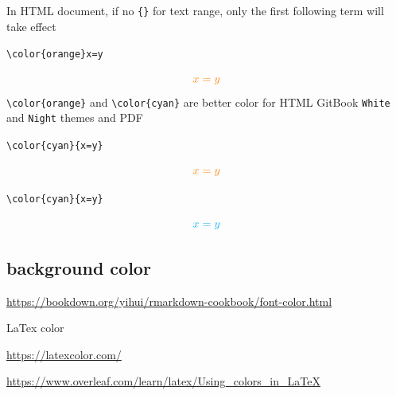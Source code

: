 \documentclass[
]{book}
\newenvironment{Shaded}{\begin{snugshade}}{\end{snugshade}}
\newcommand{\NormalTok}[1]{#1}
\theoremstyle{definition}
\theoremstyle{definition}
\theoremstyle{definition}
\theoremstyle{definition}
\theoremstyle{remark}
\begin{document}
In HTML document, if no \texttt{\{\}} for text range, only the first following term will take effect

\texttt{\textbackslash{}color\{orange\}x=y}

\[\color{orange}x=y\]
\texttt{\textbackslash{}color\{orange\}} and \texttt{\textbackslash{}color\{cyan\}} are better color for HTML GitBook \texttt{White} and \texttt{Night} themes and PDF

\texttt{\textbackslash{}color\{cyan\}\{x=y\}}

\[\color{orange}{x=y}\]

\texttt{\textbackslash{}color\{cyan\}\{x=y\}}

\[\color{cyan}{x=y}\]

\begin{Shaded}
\end{Shaded}

\subsection{background color}\label{background-color}

\url{https://bookdown.org/yihui/rmarkdown-cookbook/font-color.html}

LaTex color

\url{https://latexcolor.com/}

\url{https://www.overleaf.com/learn/latex/Using_colors_in_LaTeX}
\end{document}

